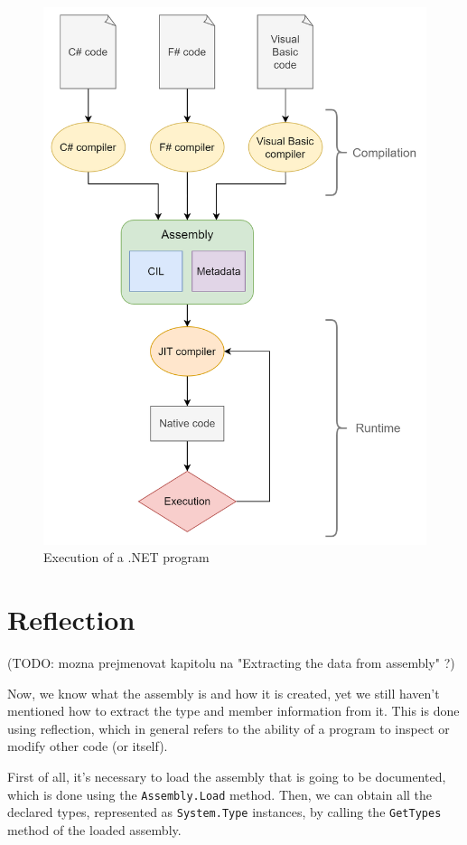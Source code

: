 \begin{figure}
\centering
\includegraphics[width=1\linewidth]{img/compilation.png}
\caption{Execution of a .NET program}
\label{fig:net_compilation}
\end{figure}

\section{Reflection}
(TODO: mozna prejmenovat kapitolu na "Extracting the data from assembly" ?)

Now, we know what the assembly is and how it is created, yet we still haven't mentioned how to extract the type and member information from it.
This is done using reflection, which in general refers to the ability of a program to inspect or modify other code (or itself).

First of all, it's necessary to load the assembly that is going to be documented, which is done using the \texttt{Assembly.Load} method.
Then, we can obtain all the declared types, represented as \texttt{System.Type} instances, by calling the \texttt{GetTypes} method of the loaded assembly.

